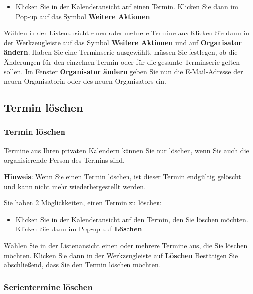\documentclass[
  letterpaper,
  DIV=11,
  numbers=noendperiod]{scrreprt}
\providecommand{\tightlist}{%
  \setlength{\itemsep}{0pt}\setlength{\parskip}{0pt}}\usepackage{longtable,booktabs,array}
\begin{document}
\begin{itemize}
\tightlist
\item
  Klicken Sie in der Kalenderansicht auf einen Termin. Klicken Sie dann
  im Pop-up auf das Symbol \textbf{Weitere Aktionen}
\end{itemize}

Wählen in der Listenansicht einen oder mehrere Termine aus Klicken Sie
dann in der Werkzeugleiste auf das Symbol \textbf{Weitere Aktionen} und
auf \textbf{Organisator ändern}. Haben Sie eine Terminserie ausgewählt,
müssen Sie festlegen, ob die Änderungen für den einzelnen Termin oder
für die gesamte Terminserie gelten sollen. Im Fenster
\textbf{Organisator ändern} geben Sie nun die E-Mail-Adresse der neuen
Organisatorin oder des neuen Organisators ein.

\subsection{Termin löschen}\label{termin-luxf6schen}

\subsubsection{Termin löschen}\label{termin-luxf6schen-1}

Termine aus Ihren privaten Kalendern können Sie nur löschen, wenn Sie
auch die organisierende Person des Termins sind.

\textbf{Hinweis:} Wenn Sie einen Termin löschen, ist dieser Termin
endgültig gelöscht und kann nicht mehr wiederhergestellt werden.

Sie haben 2 Möglichkeiten, einen Termin zu löschen:

\begin{itemize}
\tightlist
\item
  Klicken Sie in der Kalenderansicht auf den Termin, den Sie löschen
  möchten. Klicken Sie dann im Pop-up auf \textbf{Löschen}
\end{itemize}

Wählen Sie in der Listenansicht einen oder mehrere Termine aus, die Sie
löschen möchten. Klicken Sie dann in der Werkzeugleiste auf
\textbf{Löschen} Bestätigen Sie abschließend, dass Sie den Termin
löschen möchten.

\subsubsection{Serientermine löschen}\label{serientermine-luxf6schen}
\end{document}
